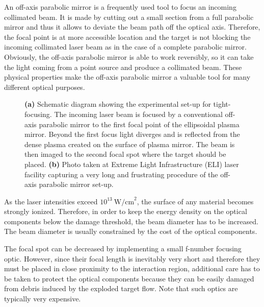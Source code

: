 An off-axis parabolic mirror is a frequently used tool to focus an incoming collimated beam. It is made by cutting out a small section from a full parabolic mirror and thus it allows to deviate the beam path off the optical axis. Therefore, the focal point is at more accessible location and the target is not blocking the incoming collimated laser beam as in the case of a complete parabolic mirror. Obviously, the off-axis parabolic mirror is able to work reversibly, so it can take the light coming from a point source and produce a collimated beam. These physical properties make the off-axis parabolic mirror a valuable tool for many different optical purposes.

\begin{figure}[h!]
	\centering
	\hspace{5mm}
	\caption{\textbf{(a)} Schematic diagram showing the experimental set-up for tight-focusing. The incoming laser beam is focused by a conventional off-axis parabolic mirror to the first focal point of the ellipsoidal plasma mirror. Beyond the first focus light diverges and is reflected from the dense plasma created on the surface of plasma mirror. The beam is then imaged to the second focal spot where the target should be placed. \textbf{(b)} Photo taken at Extreme Light Infrastructure (ELI) laser facility capturing a very long and frustrating procedure of the off-axis parabolic mirror set-up.}
	\label{fig:9}
\end{figure}

As the laser intensities exceed $ 10^{13} \ \mathrm{W/cm}^{2} $, the surface of any material becomes strongly ionized. Therefore, in order to keep the energy density on the optical components below the damage threshold, the beam diameter has to be increased. The beam diameter is usually constrained by the cost of the optical components.

The focal spot can be decreased by implementing a small f-number focusing optic. However, since their focal length is inevitably very short and therefore they must be placed in close proximity to the interaction region, additional care has to be taken to protect the optical components because they can be easily damaged from debris induced by the exploded target flow. Note that such optics are typically very expensive.